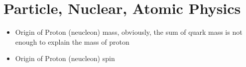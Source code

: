 \section{Particle, Nuclear, Atomic Physics}
\begin{itemize}
    \item Origin of Proton (neucleon) mass, obviously, the sum of quark mass is not enough to explain the mass of proton
    \item Origin of Proton (neucleon) spin
\end{itemize}
